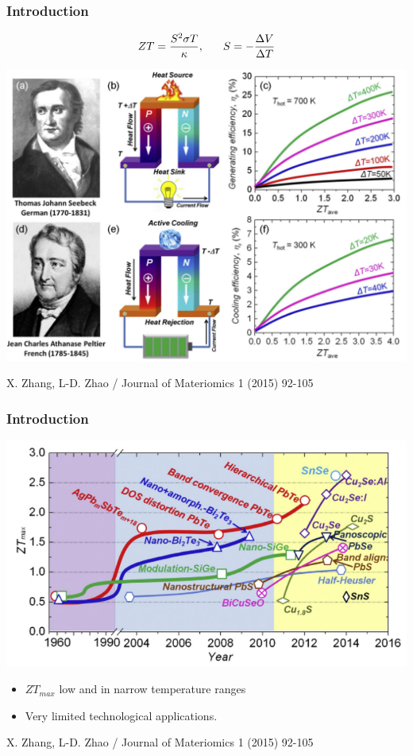 \documentclass{beamer}
\begin{document}
\begin{frame}

\frametitle{Introduction}
\vspace{-0.5cm}
\begin{equation}
ZT=\frac{S^{2}\sigma T}{\kappa}, \hspace{0.6cm} S=-\frac{\Delta V}{\Delta T}%
\nonumber
\end{equation}
\begin{center}
\includegraphics[width=0.7\linewidth]{Pictures/INTRO/generation-cooling.png}
\end{center}
\vspace{-0.1cm}
\begin{tiny}
X. Zhang, L-D. Zhao / Journal of Materiomics 1 (2015) 92-105
\end{tiny}

\end{frame}


\begin{frame}

\frametitle{Introduction}
\vspace{-0.5cm}
\begin{center}
\includegraphics[width=0.7\linewidth]{Pictures/INTRO/ztvstemp.png}
\end{center}
\vspace{-0.1cm}
\begin{itemize}
\item $ZT_{max}$ low and in narrow temperature ranges
\item Very limited technological applications.
\end{itemize}
\begin{tiny}
X. Zhang, L-D. Zhao / Journal of Materiomics 1 (2015) 92-105
\end{tiny}

\end{frame}
\end{document}
